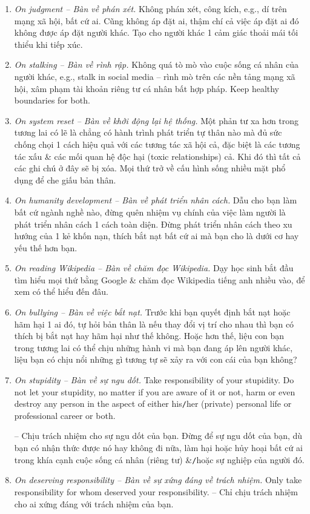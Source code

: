 \documentclass[12pt]{article}
\begin{document}
\begin{enumerate}
	\item {\it On judgment -- Bàn về phán xét.} Không phán xét, công kích, e.g., dí trên mạng xã hội, bất cứ ai. Cũng không áp đặt ai, thậm chí cả việc áp đặt ai đó không được áp đặt người khác. Tạo cho người khác 1 cảm giác thoải mái tối thiểu khi tiếp xúc.
	\item {\it On stalking -- Bàn về rình rập.} Không quá tò mò vào cuộc sống cá nhân của người khác, e.g., stalk in social media -- rình mò trên các nền tảng mạng xã hội, xâm phạm tài khoản  riêng tư cá nhân bất hợp pháp. Keep healthy boundaries for both.
	\item {\it On system reset -- Bàn về khởi động lại hệ thống.} Một phản tư xa hơn trong tương lai có lẽ là chẳng có hành trình phát triển tự thân nào mà đủ sức chống chọi 1 cách hiệu quả với các tương tác xã hội cả, đặc biệt là các tương tác xấu \& các mối quan hệ độc hại (toxic relationships) cả. Khi đó thì tất cả các ghi chú ở đây sẽ bị xóa. Mọi thứ trở về cấu hình sống nhiều mặt phổ dụng để che giấu bản thân.	
	\item {\it On humanity development -- Bàn về phát triển nhân cách.} Dẫu cho bạn làm bất cứ ngành nghề nào, đừng quên nhiệm vụ chính của việc làm người là phát triển nhân cách 1 cách toàn diện. Đừng phát triển nhân cách theo xu hướng của 1 kẻ khốn nạn, thích bắt nạt bất cứ ai mà bạn cho là dưới cơ hay yếu thế hơn bạn.
	\item {\it On reading Wikipedia -- Bàn về chăm đọc Wikipedia.} Dạy học sinh bắt đầu tìm hiểu mọi thứ bằng Google \& chăm đọc Wikipedia tiếng anh nhiều vào, để xem có thể hiểu đến đâu.
	\item {\it On bullying -- Bàn về việc bắt nạt.} Trước khi bạn quyết định bắt nạt hoặc hãm hại 1 ai đó, tự hỏi bản thân là nếu thay đổi vị trí cho nhau thì bạn có thích bị bắt nạt hay hãm hại như thế không. Hoặc hơn thế, liệu con bạn trong tương lai có thể chịu những hành vi mà bạn đang áp lên người khác, liệu bạn có chịu nổi những gì tương tự sẽ xảy ra với con cái của bạn không?
	\item {\it On stupidity -- Bàn về sự ngu dốt.} Take responsibility of your stupidity. Do not let your stupidity, no matter if you are aware of it or not, harm or even destroy any person in the aspect of either his{\tt/}her (private) personal life or professional career or both.
	
	-- Chịu trách nhiệm cho sự ngu dốt của bạn. Đừng để sự ngu dốt của bạn, dù bạn có nhận thức được nó hay không đi nữa, làm hại hoặc hủy hoại bất cứ ai trong khía cạnh cuộc sống cá nhân (riêng tư) \&{\tt/}hoặc sự nghiệp của người đó.
	\item {\it On deserving responsibility -- Bàn về sự xứng đáng về trách nhiệm.} Only take responsibility for whom deserved your responsibility. -- Chỉ chịu trách nhiệm cho ai xứng đáng với trách nhiệm của bạn.
\end{enumerate}
\end{document}
